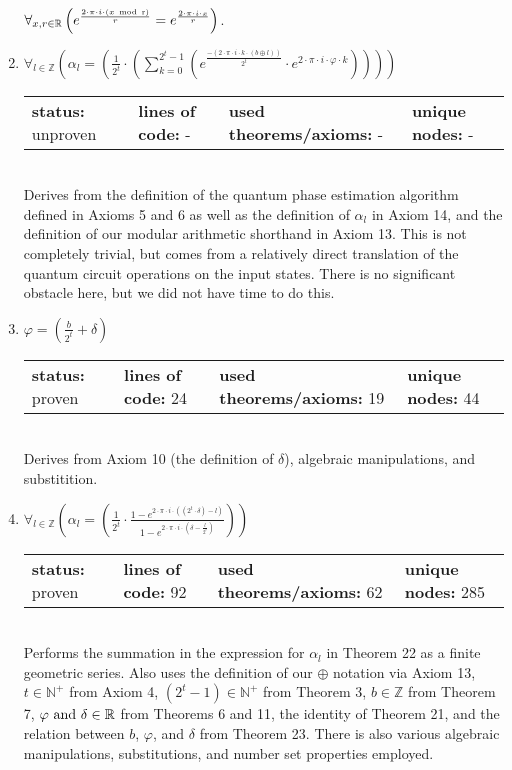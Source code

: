 \documentclass{article}[12pt]
\begin{document}
\begin{enumerate}
  $\forall_{x, r \in \mathbb{R}} \left(e^{\frac{2 \cdot \pi \cdot i \cdot \left(x ~\rm{mod}~ r\right)}{r}} = e^{\frac{2 \cdot \pi \cdot i \cdot x}{r}}\right)$.
\item $\forall_{l \in \mathbb{Z}} \left(\alpha_{l} = \left(\frac{1}{2^{t}} \cdot \left(\sum_{k=0}^{2^{t} - 1} \left(e^{\frac{-\left(2 \cdot \pi \cdot i \cdot k \cdot \left(b \oplus l\right)\right)}{2^{t}}} \cdot e^{2 \cdot \pi \cdot i \cdot \varphi \cdot k}\right)\right)\right)\right)$ \hfill \\
  \begin{tabular}{l | l | l | l}
    \textbf{status:} unproven & \textbf{lines of code:} - & \textbf{used theorems/axioms:} - & \textbf{unique nodes:} -    
  \end{tabular} \hfill \\
Derives from the definition of the quantum phase estimation algorithm defined in Axioms 5 and 6 as well as the definition of $\alpha_l$ in Axiom 14, and the definition of our modular arithmetic shorthand in Axiom 13.  This is not completely trivial, but comes from a relatively direct translation of the quantum circuit operations on the input states.  There is no significant obstacle here, but we did not have time to do this.
\item $\varphi = \left(\frac{b}{2^{t}} + \delta\right)$ \hfill \\
  \begin{tabular}{l | l | l | l}
    \textbf{status:} proven & \textbf{lines of code:} 24 & \textbf{used theorems/axioms:} 19 & \textbf{unique nodes:} 44
  \end{tabular} \hfill \\
Derives from Axiom 10 (the definition of $\delta$), algebraic manipulations, and substitition.
\item $\forall_{l \in \mathbb{Z}} \left(\alpha_{l} = \left(\frac{1}{2^{t}} \cdot \frac{1 - e^{2 \cdot \pi \cdot i \cdot \left(\left(2^{t} \cdot \delta\right) - l\right)}}{1 - e^{2 \cdot \pi \cdot i \cdot \left(\delta - \frac{l}{2^{t}}\right)}}\right)\right)$ \hfill \\
  \begin{tabular}{l | l | l | l}
    \textbf{status:} proven & \textbf{lines of code:} 92 & \textbf{used theorems/axioms:} 62 & \textbf{unique nodes:} 285
  \end{tabular} \hfill \\
  Performs the summation in the expression for $\alpha_l$ in Theorem 22 as a finite geometric series.  Also uses the definition of our $\oplus$ notation via Axiom 13, $t \in \mathbb{N}^+$ from Axiom 4, $(2^t - 1) \in \mathbb{N}^+$ from Theorem 3, $b \in \mathbb{Z}$ from Theorem 7, $\varphi~{\rm and}~\delta \in \mathbb{R}$ from Theorems 6 and 11, the identity of Theorem 21, and the relation between $b$, $\varphi$, and $\delta$ from Theorem 23.  There is also various algebraic manipulations, substitutions, and number set properties employed.

\end{enumerate}
\end{document}

